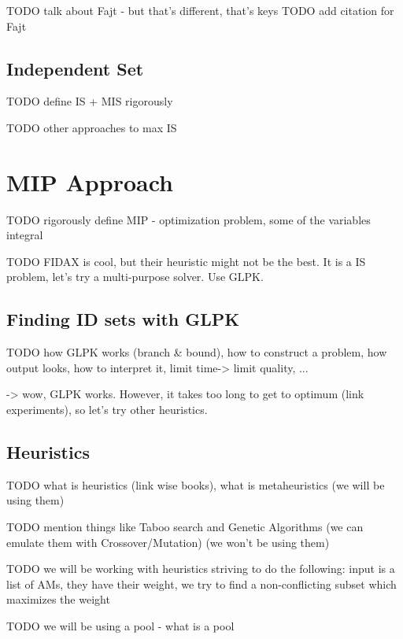 \documentclass[a4paper,12pt,oneside]{report}
\begin{document}
TODO talk about Fajt - but that's different, that's keys
TODO add citation for Fajt

\section{Independent Set}

TODO define IS + MIS rigorously

TODO other approaches to max IS

\chapter{MIP Approach}

TODO rigorously define MIP - optimization problem, some of the variables integral

TODO FIDAX is cool, but their heuristic might not be the best. It is a IS problem, let's try a multi-purpose solver. Use GLPK. 

\section{Finding ID sets with GLPK}

TODO how GLPK works (branch \& bound), how to construct a problem, how output looks, how to interpret it, limit time-> limit quality, ...
 
 -> wow, GLPK works. However, it takes too long to get to optimum (link experiments), so let's try other heuristics.
 
\section{Heuristics}

TODO what is heuristics (link wise books), what is metaheuristics (we will be using them)

TODO mention things like Taboo search and Genetic Algorithms (we can emulate them with Crossover/Mutation) (we won't be using them)

TODO we will be working with heuristics striving to do the following: input is a list of AMs, they have their weight, we try to find a non-conflicting subset which maximizes the weight

TODO we will be using a pool - what is a pool
\end{document}

